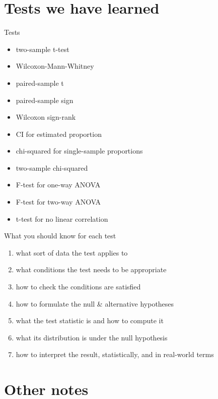 \section{Tests we have learned}

\begin{frame}{Tests}

  \begin{itemize}
    \item two-sample t-test
    \item Wilcoxon-Mann-Whitney
    \item paired-sample t
    \item paired-sample sign
    \item Wilcoxon sign-rank
    \item CI for estimated proportion
    \item chi-squared for single-sample proportions
    \item two-sample chi-squared
    \item F-test for one-way ANOVA
    \item F-test for two-way ANOVA
    \item t-test for no linear correlation
  \end{itemize}

\end{frame}

\begin{frame}{What you should know for each test}

  \begin{enumerate}
    \item what sort of data the test applies to
    \item what conditions the test needs to be appropriate
    \item how to check the conditions are satisfied
    \item how to formulate the null \& alternative hypotheses
    \item what the test statistic is and how to compute it
    \item what its distribution is under the null hypothesis
    \item how to interpret the result, statistically, and in real-world terms
  \end{enumerate}

\end{frame}

\section{Other notes}

